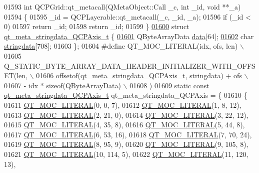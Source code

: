 \begin{DoxyCode}
01593 \textcolor{keywordtype}{int} QCPGrid::qt\_metacall(QMetaObject::Call \_c, \textcolor{keywordtype}{int} \_id, \textcolor{keywordtype}{void} **\_a)
01594 \{
01595     \_id = QCPLayerable::qt\_metacall(\_c, \_id, \_a);
01596     \textcolor{keywordflow}{if} (\_id < 0)
01597         \textcolor{keywordflow}{return} \_id;
01598     \textcolor{keywordflow}{return} \_id;
01599 \}
\hypertarget{a00067_source_l01600}{}\hyperlink{a00067}{01600} \textcolor{keyword}{struct }\hyperlink{a00067_dd/df4/a00193}{qt\_meta\_stringdata\_QCPAxis\_t} \{
\hypertarget{a00067_source_l01601}{}\hyperlink{a00067_a6de5289a2e23a98b0352a48533dedbd4}{01601}     QByteArrayData \hyperlink{a00067_a6de5289a2e23a98b0352a48533dedbd4}{data}[64];
\hypertarget{a00067_source_l01602}{}\hyperlink{a00067_a1fe440f64883a266431cf43cff1b5052}{01602}     \textcolor{keywordtype}{char} \hyperlink{a00067_a1fe440f64883a266431cf43cff1b5052}{stringdata}[708];
01603 \};
01604 \textcolor{preprocessor}{#define QT\_MOC\_LITERAL(idx, ofs, len) \(\backslash\)}
01605 \textcolor{preprocessor}{    Q\_STATIC\_BYTE\_ARRAY\_DATA\_HEADER\_INITIALIZER\_WITH\_OFFSET(len, \(\backslash\)}
01606 \textcolor{preprocessor}{    offsetof(qt\_meta\_stringdata\_QCPAxis\_t, stringdata) + ofs \(\backslash\)}
01607 \textcolor{preprocessor}{        - idx * sizeof(QByteArrayData) \(\backslash\)}
01608 \textcolor{preprocessor}{    )}
01609 \textcolor{keyword}{static} \textcolor{keyword}{const} \hyperlink{a00067_dd/df4/a00193}{qt\_meta\_stringdata\_QCPAxis\_t} qt\_meta\_stringdata\_QCPAxis = \{
01610     \{
01611 \hyperlink{a00067_a75bb9482d242cde0a06c9dbdc6b83abe}{QT\_MOC\_LITERAL}(0, 0, 7),
01612 \hyperlink{a00067_a75bb9482d242cde0a06c9dbdc6b83abe}{QT\_MOC\_LITERAL}(1, 8, 12),
01613 \hyperlink{a00067_a75bb9482d242cde0a06c9dbdc6b83abe}{QT\_MOC\_LITERAL}(2, 21, 0),
01614 \hyperlink{a00067_a75bb9482d242cde0a06c9dbdc6b83abe}{QT\_MOC\_LITERAL}(3, 22, 12),
01615 \hyperlink{a00067_a75bb9482d242cde0a06c9dbdc6b83abe}{QT\_MOC\_LITERAL}(4, 35, 8),
01616 \hyperlink{a00067_a75bb9482d242cde0a06c9dbdc6b83abe}{QT\_MOC\_LITERAL}(5, 44, 8),
01617 \hyperlink{a00067_a75bb9482d242cde0a06c9dbdc6b83abe}{QT\_MOC\_LITERAL}(6, 53, 16),
01618 \hyperlink{a00067_a75bb9482d242cde0a06c9dbdc6b83abe}{QT\_MOC\_LITERAL}(7, 70, 24),
01619 \hyperlink{a00067_a75bb9482d242cde0a06c9dbdc6b83abe}{QT\_MOC\_LITERAL}(8, 95, 9),
01620 \hyperlink{a00067_a75bb9482d242cde0a06c9dbdc6b83abe}{QT\_MOC\_LITERAL}(9, 105, 8),
01621 \hyperlink{a00067_a75bb9482d242cde0a06c9dbdc6b83abe}{QT\_MOC\_LITERAL}(10, 114, 5),
01622 \hyperlink{a00067_a75bb9482d242cde0a06c9dbdc6b83abe}{QT\_MOC\_LITERAL}(11, 120, 13),

\end{DoxyCode}
